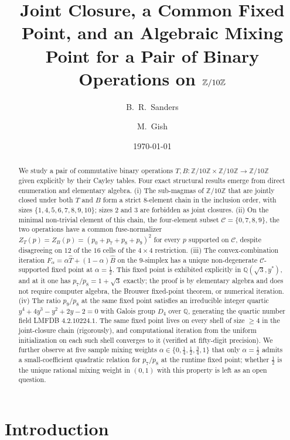 \documentclass[11pt,reqno]{amsart}
\title[Joint Closure on $\Zten$]{Joint Closure, a Common Fixed Point, and an Algebraic
Mixing Point for a Pair of Binary Operations on $\Zten$}
\author{B.~R.~Sanders}
\author{M.~Gish}
\date{\today}
\theoremstyle{plain}
\theoremstyle{definition}
\theoremstyle{remark}
\newcommand{\Z}{\mathbb{Z}}
\newcommand{\Q}{\mathbb{Q}}
\newcommand{\Zten}{\Z/10\Z}
\newcommand{\Cfour}{\mathcal{C}}
\newcommand{\Tfuse}{\widehat{T}}
\newcommand{\Bfuse}{\widehat{B}}
\newcommand{\Fmix}{F_{\alpha}}
\begin{document}
\begin{abstract}
We study a pair of commutative binary operations
$T,B:\Zten\times\Zten\to\Zten$ given explicitly by their Cayley
tables. Four exact structural results emerge from direct
enumeration and elementary algebra. (i) The sub-magmas of $\Zten$
that are jointly closed under both $T$ and $B$ form a strict
$8$-element chain in the inclusion order, with sizes
$\{1,4,5,6,7,8,9,10\}$; sizes $2$ and $3$ are forbidden as joint
closures. (ii) On the minimal non-trivial element of this
chain, the four-element subset $\Cfour=\{0,7,8,9\}$, the two
operations have a common fuse-normalizer
$Z_{T}(p)=Z_{B}(p)=(p_{0}+p_{7}+p_{8}+p_{9})^{2}$ for every $p$
supported on $\Cfour$, despite disagreeing on $12$ of the $16$
cells of the $4\times 4$ restriction. (iii) The convex-combination
iteration $\Fmix=\alpha\Tfuse+(1-\alpha)\Bfuse$ on the $9$-simplex
has a unique non-degenerate $\Cfour$-supported fixed point at
$\alpha=\tfrac12$. This fixed point is exhibited explicitly in
$\Q(\sqrt{3},y^{*})$, and at it one has
$p_{7}/p_{8}=1+\sqrt{3}$ exactly;
the proof is by elementary algebra and does not require computer
algebra, the Brouwer fixed-point theorem, or numerical iteration.
(iv) The ratio $p_{9}/p_{8}$ at the same fixed point satisfies an
irreducible integer quartic $y^{4}+4y^{3}-y^{2}+2y-2=0$ with
Galois group $D_{4}$ over $\Q$, generating the quartic number
field LMFDB \textnumero $4.2.10224.1$. The same fixed point lives
on every shell of size $\geq 4$ in the joint-closure chain
(rigorously), and computational iteration from the uniform
initialization on each such shell converges to it (verified at
fifty-digit precision). We further
observe at five sample mixing weights
$\alpha\in\{0,\tfrac14,\tfrac12,\tfrac34,1\}$ that only
$\alpha=\tfrac12$ admits a small-coefficient quadratic relation
for $p_{7}/p_{8}$ at the runtime fixed point; whether $\tfrac12$
is the unique rational mixing weight in $(0,1)$ with this property
is left as an open question.
\end{abstract}

\maketitle

\section{Introduction}\label{sec:intro}
\end{document}

